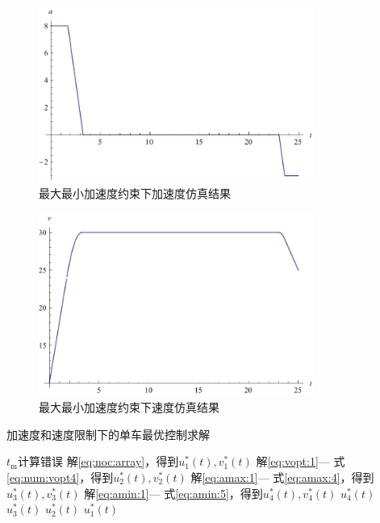\begin{figure}[htbp]
\centering
\includegraphics[width=9cm]{figures/uopt/ma.pdf}
\caption{最大最小加速度约束下加速度仿真结果}
\label{fig:amin:ma}
\end{figure}
\begin{figure}[htbp]
\centering
\includegraphics[width=9cm]{figures/uopt/mv.pdf}
\caption{最大最小加速度约束下速度仿真结果}
\label{fig:amin:mv}
\end{figure}

\begin{algorithm}
\caption{加速度和速度限制下的单车最优控制求解}
\label{alg:asin}
\begin{algorithmic}
  \Statex
      \State $t_\mathrm{m}$计算错误
      \State \Return
    \EndIf
    \State 解\eqref{eq:noc:array}，得到$u_1^*(t),v^*_1(t)$
      \State 解\eqref{eq:vopt:1}--- 式\eqref{eq:num:vopt4}，得到$u_2^*(t),v^*_2(t)$
        \State 解\eqref{eq:amax:1}--- 式\eqref{eq:amax:4}，得到$u_3^*(t),v^*_3(t)$
          \State 解\eqref{eq:amin:1}--- 式\eqref{eq:amin:5}，得到$u_4^*(t),v^*_4(t)$
          \State \Return $u_4^*(t)$
        \Else
          \State \Return $u_3^*(t)$
        \EndIf
      \Else
        \State \Return $u_2^*(t)$
      \EndIf
    \Else
      \State \Return $u_1^*(t)$
    \EndIf
  \EndFunction
\end{algorithmic}
\end{algorithm}

